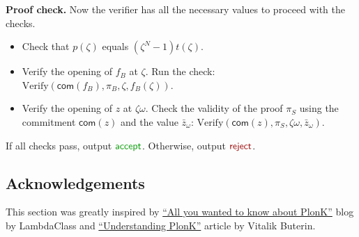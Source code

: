 \documentclass[../lecture-notes-148x210.tex]{subfiles}
\begin{document}
\textcolor{blue!60!black}{\textbf{Proof check.}} Now the verifier has all the
necessary values to proceed with the checks.
\begin{itemize}
    \item Check that $p(\zeta)$ equals $(\zeta^N - 1)t(\zeta)$.
    \item Verify the opening of $f_{B}$ at $\zeta$. 
    Run the check: $
            \text{Verify}(\mathsf{com}(f_{B}), \pi_{B}, \zeta, f_{B}(\zeta))
            $.
    \item Verify the opening of $z$ at $\zeta\omega$. 
    Check the
    validity of the proof $\pi_{S}$ using the commitment $\mathsf{com}(z)$ and the
    value $\bar{z}_{\omega}$: $
            \text{Verify}(\mathsf{com}(z), \pi_{S}, \zeta\omega, \bar{z}_{\omega})
            $.
\end{itemize}

If all checks pass, output $\textcolor{green!60!black}{\mathsf{accept}}$.
Otherwise, output $\textcolor{red!60!black}{\mathsf{reject}}$.

\subsection*{Acknowledgements}

This section was greatly inspired by
\href{https://blog.lambdaclass.com/all-you-wanted-to-know-about-plonk/}{``All
you wanted to know about PlonK''} blog by LambdaClass and
\href{https://vitalik.eth.limo/general/2019/09/22/plonk.html}{``Understanding
PlonK''} article by Vitalik Buterin.
\end{document}
